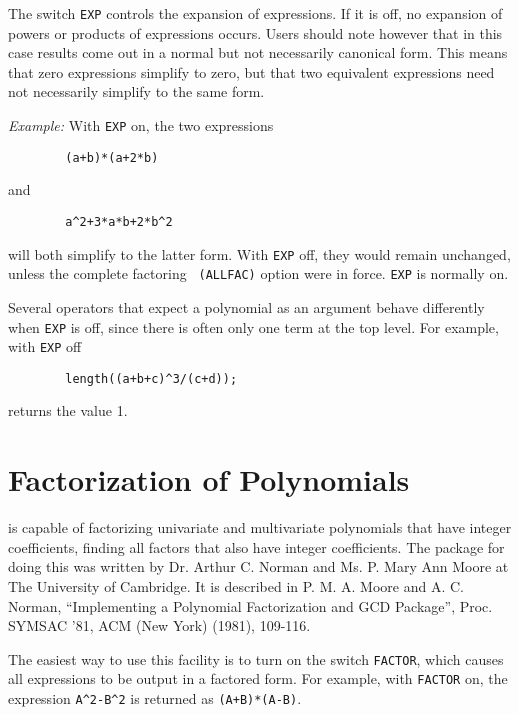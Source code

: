 The switch {\tt EXP} controls the expansion of expressions.  If
it is off, no expansion of powers or products of expressions occurs.
Users should note however that in this case results come out in a normal
but not necessarily canonical form.  This means that zero expressions
simplify to zero, but that two equivalent expressions need not necessarily
simplify to the same form.

{\it Example:} With {\tt EXP} on, the two expressions
\begin{verbatim}
        (a+b)*(a+2*b)
\end{verbatim}
and
\begin{verbatim}
        a^2+3*a*b+2*b^2
\end{verbatim}
will both simplify to the latter form.  With {\tt EXP}
off, they would remain unchanged, unless the complete factoring {\tt
(ALLFAC)} option were in force. {\tt EXP} is normally on.

Several operators that expect a polynomial as an argument behave
differently when {\tt EXP} is off, since there is often only one term at
the top level.  For example, with {\tt EXP} off
\begin{verbatim}
        length((a+b+c)^3/(c+d));
\end{verbatim}
returns the value 1.

\section{Factorization of Polynomials}
\hypertarget{switch:FACTOR}{}
\hypertarget{switch:IFACTOR}{}
{\REDUCE} is capable of factorizing univariate and multivariate polynomials
that have integer coefficients, finding all factors that also have integer
coefficients. The package for doing this was written by Dr. Arthur C.
Norman and Ms. P. Mary Ann Moore at The University of Cambridge. It is
described in P. M. A. Moore and A. C. Norman, ``Implementing a Polynomial
Factorization and GCD Package'', Proc. SYMSAC '81, ACM (New York) (1981),
109-116.

The easiest way to use this facility is to turn on the switch
{\tt FACTOR}, which causes all expressions to be output in
a factored form.  For example, with {\tt FACTOR} on, the expression
{\tt A\verb|^|2-B\verb|^|2} is returned as {\tt (A+B)*(A-B)}.


